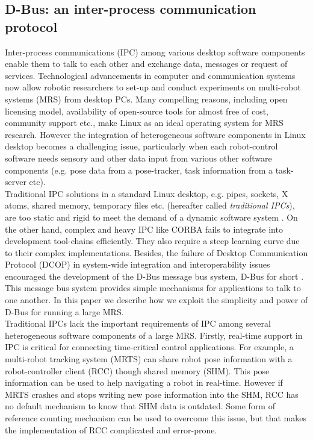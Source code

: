 \subsection{D-Bus: an inter-process communication protocol}
\label{expt-tools:dbus}
Inter-process communications (IPC) among various desktop software components enable them to talk to each other and exchange data, messages or request of services. Technological advancements in computer and communication systems now allow robotic researchers to set-up and conduct experiments on multi-robot systems (MRS) from desktop PCs. Many compelling reasons, including open licensing model, availability of open-source tools for almost free of cost, community support etc., make Linux as an ideal operating system for MRS research. However the integration of heterogeneous software components in Linux desktop becomes a challenging issue, particularly when each robot-control software needs sensory and other data input from various other software components (e.g. pose data from a pose-tracker, task information from a task-server etc).\\ 
Traditional IPC solutions in a standard Linux desktop, e.g. pipes, sockets, X atoms, shared memory, temporary files etc. (hereafter called {\em traditional IPCs}), are too static and rigid to meet the demand of a dynamic software system \cite{wittenburg2005}. On the other hand, complex and heavy IPC like CORBA fails to integrate into development tool-chains efficiently. They also require a steep learning curve due to their complex implementations. Besides, the failure of Desktop Communication Protocol (DCOP) in system-wide integration and interoperability issues encouraged the development of the D-Bus message bus system, D-Bus for short \cite{Pennington+2010}. This message bus system provides simple mechanisms for applications to talk to one another. In this paper we describe how we exploit the simplicity and power of D-Bus for running a large MRS.\\
Traditional IPCs lack the important requirements of IPC among several heterogeneous software components of a large MRS. Firstly, real-time support in IPC is critical for connecting time-critical control applications. For example, a multi-robot tracking system (MRTS) can share robot pose information with a robot-controller client (RCC) though shared memory (SHM). This pose information can be used to help navigating a robot in real-time. However if MRTS crashes and stops writing new pose information into the SHM, RCC has no default mechanism to know that SHM data is outdated. Some form of reference counting mechanism can be used to overcome this issue, but that makes the implementation of RCC complicated and error-prone.\\
